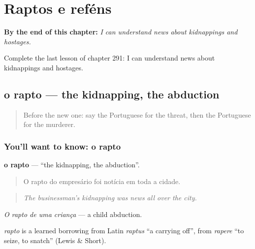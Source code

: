 
\chapter{Raptos e reféns}
\label{ch:pt-raptos-e-refens}

\begin{chapteropening}
\textbf{By the end of this chapter:} \emph{I can understand news about kidnappings and hostages.}

Complete the last lesson of chapter 291: I can understand news about kidnappings and hostages.
\end{chapteropening}

\section[o rapto]{o rapto — the kidnapping, the abduction}

\label{lesson:PT-C291-rapto}



\begin{quote}
Before the new one: say the Portuguese for the threat, then the Portuguese for the murderer.
\end{quote}

\subsection*{You'll want to know: o rapto}
\textbf{o rapto} — \textquotedblleft{}the kidnapping, the abduction\textquotedblright{}.

\begin{quote}
O rapto do empresário foi notícia em toda a cidade.
\end{quote}

\begin{quote}
\emph{The businessman’s kidnapping was news all over the city.}
\end{quote}

\emph{O rapto de uma criança} — a child abduction.

\begin{cousinweb}
\emph{rapto} is a learned borrowing from Latin \emph{raptus} \textquotedblleft{}a carrying off\textquotedblright{}, from \emph{rapere} \textquotedblleft{}to seize, to snatch\textquotedblright{} (Lewis \& Short).
\end{cousinweb}

